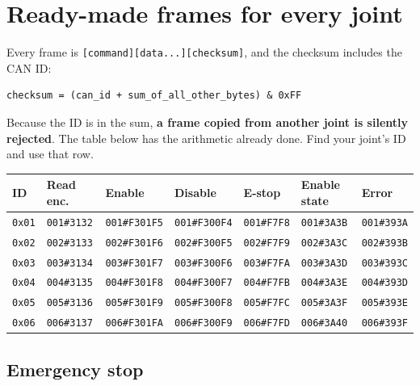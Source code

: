 \documentclass[11pt,letterpaper]{article}
\begin{document}
\section{Ready-made frames for every joint}
\label{sec:frames}

Every frame is \texttt{[command][data...][checksum]}, and the checksum includes the
CAN ID:

\begin{lstlisting}
checksum = (can_id + sum_of_all_other_bytes) & 0xFF
\end{lstlisting}

Because the ID is in the sum, \textbf{a frame copied from another joint is
silently rejected}. The table below has the arithmetic already done. Find your
joint's ID and use that row.

\begin{center}
\begin{tabular}{lllllll}
\toprule
\textbf{ID} & \textbf{Read enc.} & \textbf{Enable} & \textbf{Disable}
            & \textbf{E-stop} & \textbf{Enable state} & \textbf{Error} \\ \midrule
\texttt{0x01} & \texttt{001\#3132} & \texttt{001\#F301F5} & \texttt{001\#F300F4} & \texttt{001\#F7F8} & \texttt{001\#3A3B} & \texttt{001\#393A} \\
\texttt{0x02} & \texttt{002\#3133} & \texttt{002\#F301F6} & \texttt{002\#F300F5} & \texttt{002\#F7F9} & \texttt{002\#3A3C} & \texttt{002\#393B} \\
\texttt{0x03} & \texttt{003\#3134} & \texttt{003\#F301F7} & \texttt{003\#F300F6} & \texttt{003\#F7FA} & \texttt{003\#3A3D} & \texttt{003\#393C} \\
\texttt{0x04} & \texttt{004\#3135} & \texttt{004\#F301F8} & \texttt{004\#F300F7} & \texttt{004\#F7FB} & \texttt{004\#3A3E} & \texttt{004\#393D} \\
\texttt{0x05} & \texttt{005\#3136} & \texttt{005\#F301F9} & \texttt{005\#F300F8} & \texttt{005\#F7FC} & \texttt{005\#3A3F} & \texttt{005\#393E} \\
\texttt{0x06} & \texttt{006\#3137} & \texttt{006\#F301FA} & \texttt{006\#F300F9} & \texttt{006\#F7FD} & \texttt{006\#3A40} & \texttt{006\#393F} \\
\bottomrule
\end{tabular}
\end{center}

\subsection{Emergency stop}
\end{document}
